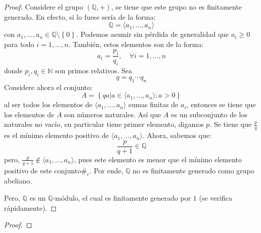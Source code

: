 \documentclass[12pt]{report}
\newcounter{it}
\theoremstyle{largebreak}
\newcommand\contradiction{\ensuremath{\#_c}}
\begin{document}
    \begin{proof}
        Considere el grupo $(\mathbb{Q},+)$, se tiene que este grupo no es finitamente generado. En efecto, si lo fuese sería de la forma:
        \begin{equation*}
            \mathbb{Q}=\langle a_1,\dots,a_n \rangle
        \end{equation*}
        con $a_1,...,a_n\in\mathbb{Q}\setminus\left\{0\right\}$. Podemos asumir sin pérdida de generalidad que $a_i\geq 0$ para todo $i=1,...,n$. También, estos elementos son de la forma:
        \begin{equation*}
            a_i=\frac{p_i}{q_i},\quad\forall i=1,...,n
        \end{equation*}
        donde $p_i,q_i\in\mathbb{N}$ son primos relativos. Sea
        \begin{equation*}
            q=q_1\cdots q_n
        \end{equation*}
        Considere ahora el conjunto:
        \begin{equation*}
            A=\left\{qa\Big|a\in\langle a_1,\dots,a_n \rangle;a>0 \right\}
        \end{equation*}
        al ser todos los elementos de $\langle a_1,\dots,a_n \rangle$ sumas finitas de $a_i$, entonces se tiene que los elementos de $A$ son números naturales. Así que $A$ es un subconjunto de los naturales no vacío, en particular tiene primer elemento, digamos $p$. Se tiene que $\frac{p}{q}$ es el mínimo elemento positivo de $\langle a_1,\dots,a_n \rangle$. Ahora, sabemos que:
        \begin{equation*}
            \frac{p}{q+1}\in\mathbb{Q}
        \end{equation*}
        pero, $\frac{p}{q+1}\notin\langle a_1,\dots,a_n \rangle$, pues este elemento es menor que el mínimo elemento positivo de este conjunto\contradiction. Por ende, $\mathbb{Q}$ no es finitamente generado como grupo abeliano.

        Pero, $\mathbb{Q}$ es un $\mathbb{Q}$-módulo, el cual es finitamente generado por $1$ (se verifica rápidamente).
    \end{proof}

    \begin{excer}
        
    \end{excer}

    \begin{proof}
        
    \end{proof}
\end{document}
